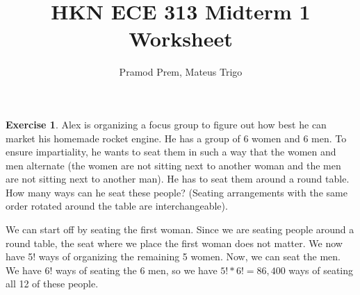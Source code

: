 \documentclass[12pt]{amsart}
\title{HKN ECE 313 Midterm 1 Worksheet}
\author{Pramod Prem, Mateus Trigo}
\theoremstyle{definition}
\newtheorem{exercise}{Exercise}
\numberwithin{equation}{section}
\theoremstyle{plain}
\begin{document}
\maketitle

\begin{exercise}
\newline
Alex is organizing a focus group to figure out how best he can market his homemade rocket engine. He has a group of 6 women and 6 men. To ensure impartiality, he wants to seat them in such a way that the women and men alternate (the women are not sitting next to another woman and the men are not sitting next to another man). He has to seat them around a round table. How many ways can he seat these people? (Seating arrangements with the same order rotated around the table are interchangeable).
\newline
\begin{answer}We can start off by seating the first woman. Since we are seating people around a round table, the seat where we place the first woman does not matter. We now have 5! ways of organizing the remaining 5 women. Now, we can seat the men. We have 6! ways of seating the 6 men, so we have $5!*6!=86,400$ ways of seating all 12 of these people.
\end{answer}
\end{exercise}
\end{document}
